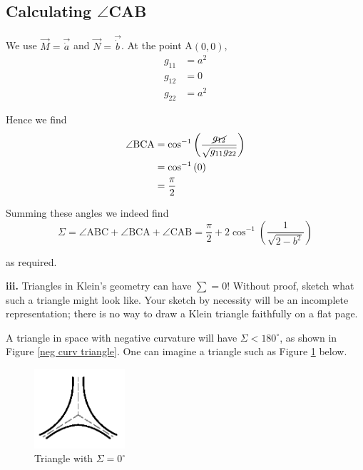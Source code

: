 \documentclass[a4paper]{article} %
\begin{document}
\subsection*{Calculating $\angle$CAB}
We use $\vec{M}=\vec{\dot{a}}$ and $\vec{N}=\vec{\dot{b}}$. At the point A$(0,0)$,
\begin{align}
g_{11}&=a^2\\
g_{12}&=0\\
g_{22}&=a^2
\end{align}

Hence we find
\begin{align}
\angle\text{BCA}&=\cos^{-1}\left(\frac{\cancel{g_{12}}}{\sqrt{g_{11}g_{22}}}\right)\\
&=\cos^{-1}\left(0\right)\\
&=\frac{\pi}{2}
\end{align}

Summing these angles we indeed find
\begin{equation}
\Sigma = \angle\text{ABC}+\angle\text{BCA}+\angle\text{CAB}=\frac{\pi}{2}+2\cos^{-1}\left(\frac{1}{\sqrt{2-b^2}}\right)
\end{equation}

as required.

\pagebreak  %

\begin{framed}
\textbf{iii.} Triangles in Klein's geometry can have $\sum=0$! Without proof, sketch what such a triangle might look like. Your sketch by necessity will be an incomplete representation; there is no way to draw a Klein triangle faithfully on a flat page.
\end{framed}

A triangle in space with negative curvature will have $\Sigma<180^{\circ}$, as shown in Figure \ref{neg curv triangle}. One can imagine a triangle such as Figure \ref{no angle triangle} below.

\begin{figure}[h]
\centering
\includegraphics[width=0.3\textwidth]{images/zeroAngle.png}
\caption{Triangle with $\Sigma=0^{\circ}$}
\label{no angle triangle}
\end{figure}
\end{document}
